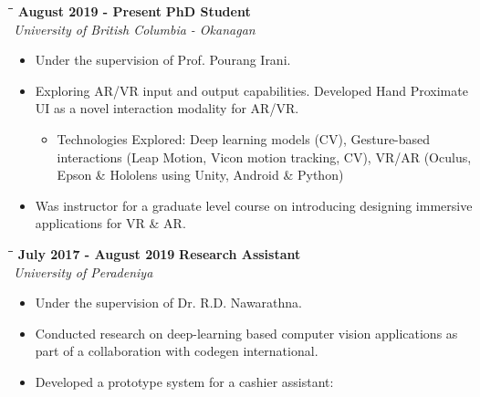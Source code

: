 \documentclass[a4paper,10pt]{article}
\begin{document}
{\begin{minipage}[t]{0.60\textwidth}
\begin{itemize}
    \end{itemize}
    \begin{tabbing}
      \=\hspace*{6cm}\=\hspace*{5cm}\= \kill
      \>\textbf{ August 2019 - Present} \> \textbf{PhD Student}\\\>\> \emph{University of British Columbia - Okanagan}
    \end{tabbing}
    \vspace{-0.4cm}
    \begin{itemize}
      \setlength\itemsep{-0.1pt}
      \small
    \item Under the supervision of Prof. Pourang Irani.
    \item Exploring AR/VR input and output capabilities. Developed Hand Proximate UI as a novel interaction modality for AR/VR.
      \vspace{-5pt}
      \begin{itemize}
      \item Technologies Explored: Deep learning models (CV), Gesture-based interactions (Leap Motion, Vicon motion tracking, CV), VR/AR (Oculus, Epson \& Hololens using Unity, Android \& Python)
      \end{itemize}
      \vspace{-0.2cm}
    \item Was instructor for a graduate level course on introducing designing immersive applications for VR \& AR.
    \end{itemize}
    \begin{tabbing}
      \=\hspace*{6cm}\=\hspace*{5cm}\= \kill
      \>\textbf{ July 2017 - August 2019} \> \textbf{Research Assistant}\\\>\> \emph{University of Peradeniya}
    \end{tabbing}
    \vspace{-0.5cm}
    \begin{itemize}
      \setlength\itemsep{-0.1pt}
      \small
    \item Under the supervision of Dr. R.D. Nawarathna.
    \item Conducted research on deep-learning based computer vision applications as part of a collaboration with codegen international.
    \item Developed a prototype system for a cashier assistant:
      \vspace{-5pt}
      \begin{itemize}

\end{itemize}
\end{itemize}
\end{minipage}}
\end{document}
